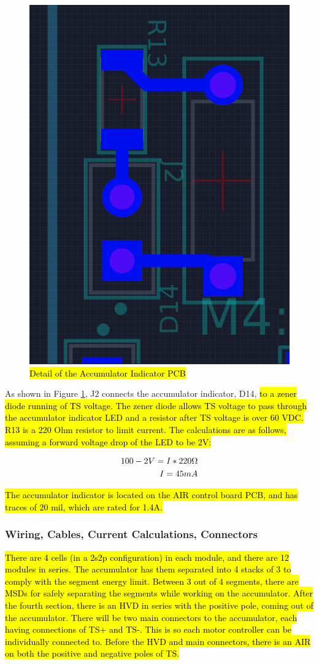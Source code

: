 \documentclass{article}
\DeclareRobustCommand{\hlr}[1]{{\sethlcolor{red}\hl{#1}}}
\begin{document}
            \begin{figure}[H]
                \centering
                \includegraphics[width = 0.3 \textwidth]{ai}
                \caption{\hlr{Detail of the Accumulator Indicator PCB}}
                \label{indicator}
            \end{figure}

            As shown in Figure \ref{indicator}, J2 connects the accumulator indicator, D14, \hlr{to a zener diode running of TS voltage. The zener diode allows TS voltage to pass through the accumulator indicator LED and a resistor after TS voltage is over 60 VDC.  R13 is a 220 Ohm resistor to limit current. The calculations are as follows, assuming a forward voltage drop of the LED to be 2V:}

            \begin{align}
                100-2 V = I * 220 \ohm \\
                I = 45 mA
            \end{align}

            \hlr{The accumulator indicator is located on the AIR control board PCB, and has traces of 20 mil, which are rated for 1.4A. }

        \subsubsection{Wiring, Cables, Current Calculations, Connectors} \label{batteryconnectors}

            \hlr{There are 4 cells (in a 2s2p configuration) in each module, and there are 12 modules in series. The accumulator has them separated into 4 stacks of 3 to comply with the segment energy limit. Between 3 out of 4 segments, there are MSDs for safely separating the segments while working on the accumulator. After the fourth section, there is an HVD in series with the positive pole, coming out of the accumulator. There will be two main connectors to the accumulator, each having connections of TS+ and TS-. This is so each motor controller can be individually connected to. Before the HVD and main connectors, there is an AIR on both the positive and negative poles of TS. }
\end{document}
